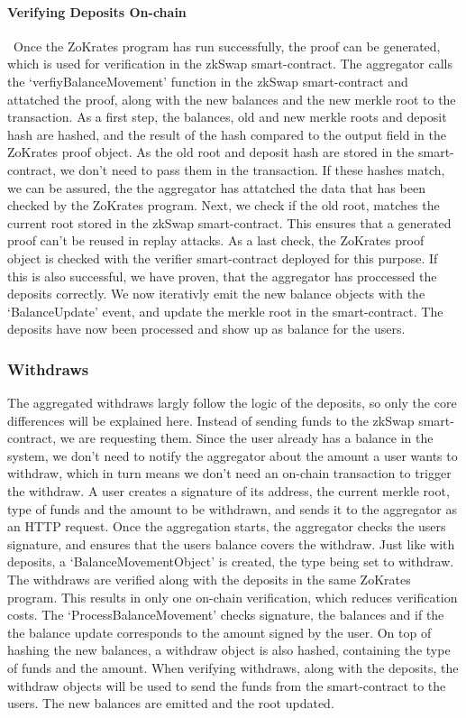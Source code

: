 \documentclass[../../thesis.tex]{subfiles}
\begin{document}
\paragraph{Verifying Deposits On-chain} \
Once the ZoKrates program has run successfully, the proof can be generated, which is used for verification in the zkSwap smart-contract. The aggregator calls the `verfiyBalanceMovement' function in the zkSwap smart-contract and attatched the proof, along with the new balances and the new merkle root to the transaction. As a first step, the balances, old and new merkle roots and deposit hash are hashed, and the result of the hash compared to the output field in the ZoKrates proof object. As the old root and deposit hash are stored in the smart-contract, we don't need to pass them in the transaction. If these hashes match, we can be assured, the the aggregator has attatched the data that has been checked by the ZoKrates program. Next, we check if the old root, matches the current root stored in the zkSwap smart-contract. This ensures that a generated proof can't be reused in replay attacks. As a last check, the ZoKrates proof object is checked with the verifier smart-contract deployed for this purpose. If this is also successful, we have proven, that the aggregator has proccessed the deposits correctly. We now iterativly emit the new balance objects with the `BalanceUpdate' event, and update the merkle root in the smart-contract. The deposits have now been processed and show up as balance for the users. 

\subsubsection{Withdraws} \label{with}
The aggregated withdraws largly follow the logic of the deposits, so only the core differences will be explained here. Instead of sending funds to the zkSwap smart-contract, we are requesting them. Since the user already has a balance in the system, we don't need to notify the aggregator about the amount a user wants to withdraw, which in turn means we don't need an on-chain transaction to trigger the withdraw. A user creates a signature of its address, the current merkle root, type of funds and the amount to be withdrawn, and sends it to the aggregator as an HTTP request. Once the aggregation starts, the aggregator checks the users signature, and ensures that the users balance covers the withdraw. Just like with deposits, a `BalanceMovementObject' is created, the type being set to withdraw. The withdraws are verified along with the deposits in the same ZoKrates program. This results in only one on-chain verification, which reduces verification costs. The `ProcessBalanceMovement' checks signature, the balances and if the the balance update corresponds to the amount signed by the user. On top of hashing the new balances, a withdraw object is also hashed, containing the type of funds and the amount. When verifying withdraws, along with the deposits, the withdraw objects will be used to send the funds from the smart-contract to the users. The new balances are emitted and the root updated. 
\end{document}
